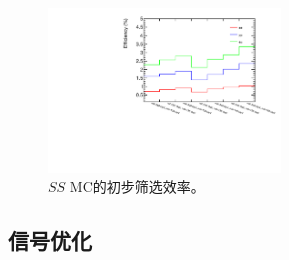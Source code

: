 \begin{figure}
\centering
\includegraphics[width=0.55\textwidth, angle =-90]{fig/SigTopo/eff_presel_SS.pdf}
\caption{$SS$ MC的初步筛选效率。}
\label{fig:eff_pre_sel_SS}
\end{figure}

\subsection{信号优化}
